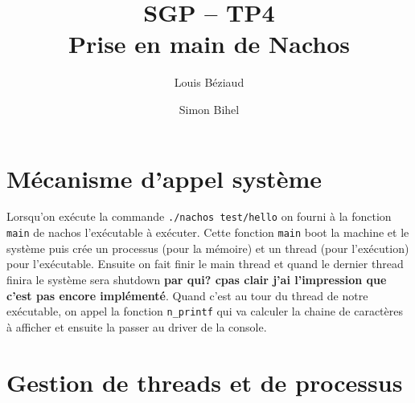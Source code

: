 \documentclass[a4paper,11pt,french]{article}
\title{SGP -- TP4\\Prise en main de Nachos}
\author{Louis Béziaud \and Simon Bihel}
\begin{document}
\maketitle

\section{Mécanisme d'appel système}
Lorsqu'on exécute la commande \texttt{./nachos test/hello} on fourni à la fonction \texttt{main} de nachos l'exécutable à exécuter. Cette fonction \texttt{main} boot la machine et le système puis crée un processus (pour la mémoire) et un thread (pour l'exécution) pour l'exécutable. Ensuite on fait finir le main thread et quand le dernier thread finira le système sera shutdown {\bf par qui? cpas clair j'ai l'impression que c'est pas encore implémenté}. Quand c'est au tour du thread de notre exécutable, on appel la fonction \texttt{n\_printf} qui va calculer la chaine de caractères à afficher et ensuite la passer au driver de la console.

\section{Gestion de threads et de processus}
\end{document}
